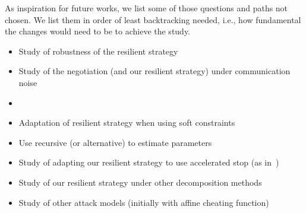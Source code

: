 \documentclass[../main.tex]{subfiles}
\begin{document}
As inspiration for future works, we list some of those questions and paths not chosen. We list them in order of least backtracking needed, i.e., how fundamental the changes would need to be to achieve the study.
\begin{itemize}
  \item Study of robustness of the resilient strategy
  \item Study of the negotiation (and our resilient strategy) under communication noise
  \item {}
  \item Adaptation of resilient strategy when using soft constraints~\cite{AlessioBemporad2009}
  \item Use recursive \EM{} (or alternative) to estimate parameters
  \item Study of adapting our resilient strategy to use accelerated stop (as in~\cite{DaiEtAl2017})
  \item Study of our resilient strategy under other decomposition methods
  \item Study of other attack models (initially with affine cheating function)
\end{itemize}
\end{document}
